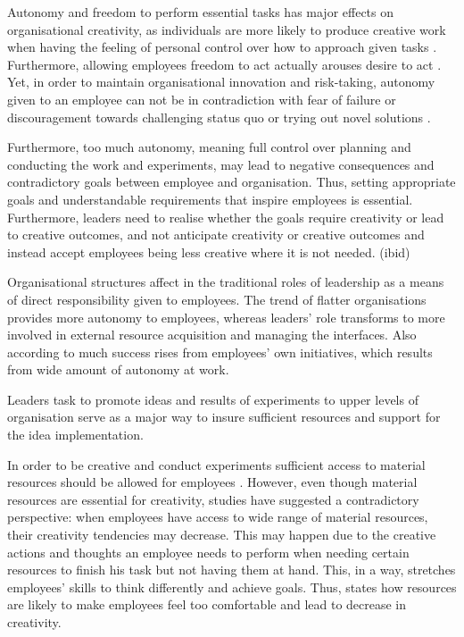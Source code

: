 Autonomy and freedom to perform essential tasks has major effects on organisational creativity, as individuals are more likely to produce creative work when having the feeling of personal control over how to approach given tasks \citep{amabile1996assessing,shalley2004leaders}. Furthermore, allowing employees freedom to act actually arouses desire to act \citep{kanter1983change}. Yet, in order to maintain organisational innovation and risk-taking, autonomy given to an employee can not be in contradiction with fear of failure or discouragement towards challenging status quo or trying out novel solutions \citep{yukl2002leadership}. 

Furthermore, too much autonomy, meaning full control over planning and conducting the work and experiments, may lead to negative consequences and contradictory goals between employee and organisation. \citep{shalley2004leaders} Thus, setting appropriate goals and understandable requirements that inspire employees is essential. Furthermore, leaders need to realise whether the goals require creativity or lead to creative outcomes, and not anticipate creativity or creative outcomes and instead accept employees being less creative where it is not needed. (ibid)

Organisational structures affect in the traditional roles of leadership as a means of direct responsibility given to employees. The trend of flatter organisations provides more autonomy to employees, whereas leaders' role transforms to more involved in external resource acquisition and managing the interfaces. \citep{shalley2004leaders} Also according to \citet{amabile2008creativity}  much success rises from employees' own initiatives, which results from wide amount of autonomy at work. \citep{amabile2008creativity} 

Leaders task to promote ideas and results of experiments to upper levels of organisation serve as a major way to insure sufficient resources and support for the idea implementation. \citep{mumford2002leading}  

In order to be creative and conduct experiments sufficient access to material resources should be allowed for employees \citep{katz1985project}. However, even though material resources are essential for creativity, studies have suggested a contradictory perspective: when employees have access to wide range of material resources, their creativity tendencies may decrease. This may happen due to the creative actions and thoughts an employee needs to perform when needing certain resources to finish his task but not having them at hand. This, in a way, stretches employees' skills to think differently and achieve goals. \citep{csikszentmihalyi199916} Thus, \citet{csikszentmihalyi199916} states how resources are likely to make employees feel too comfortable and lead to decrease in creativity. 

